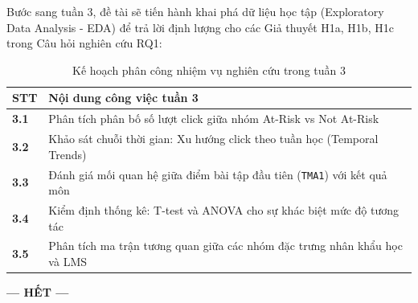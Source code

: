 \documentclass[11pt,a4paper]{article}
\begin{document}
Bước sang tuần 3, đề tài sẽ tiến hành khai phá dữ liệu học tập (Exploratory Data Analysis - EDA) để trả lời định lượng cho các Giả thuyết H1a, H1b, H1c trong Câu hỏi nghiên cứu RQ1:

\begin{table}[H]
\centering
\small
\renewcommand{\arraystretch}{1.25}
\begin{tabularx}{\textwidth}{@{}>{\centering\arraybackslash}p{1.2cm} X@{}}
\toprule
\textbf{STT} & \textbf{Nội dung công việc tuần 3} \\
\midrule
\textbf{3.1} & Phân tích phân bố số lượt click giữa nhóm At-Risk vs Not At-Risk \\
\textbf{3.2} & Khảo sát chuỗi thời gian: Xu hướng click theo tuần học (Temporal Trends) \\
\textbf{3.3} & Đánh giá mối quan hệ giữa điểm bài tập đầu tiên (\texttt{TMA1}) với kết quả môn \\
\textbf{3.4} & Kiểm định thống kê: T-test và ANOVA cho sự khác biệt mức độ tương tác \\
\textbf{3.5} & Phân tích ma trận tương quan giữa các nhóm đặc trưng nhân khẩu học và LMS \\
\bottomrule
\end{tabularx}
\caption{Kế hoạch phân công nhiệm vụ nghiên cứu trong tuần 3}
\end{table}

\vspace{0.8cm}
\begin{center}
    \textbf{--- HẾT ---}
\end{center}
\end{document}
